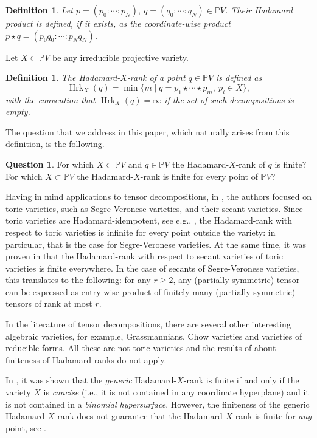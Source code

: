\documentclass{amsart}
\theoremstyle{plain}
\numberwithin{theorem}{section}
\newtheorem{definition}[theorem]{Definition}
\theoremstyle{definition}
\newtheorem*{question}{Question}
\newcommand{\bbP}{\mathbb{P}}
\newcommand{\Hrk}{\operatorname{Hrk}}
\begin{document}
\begin{definition}\label{def:hadamard_product}
    Let $p = (p_0:\cdots:p_N), \ q=(q_0:\cdots:q_N)\in\bbP V$. Their \emph{Hadamard product} is defined, if it exists, as the coordinate-wise product $p\star q = (p_0q_0:\cdots:p_Nq_N)$.
\end{definition}
Let $X \subset \bbP V$ be any irreducible projective variety.
\begin{definition}\label{def:Hadamard_rank}
    The \emph{Hadamard-$X$-rank} of a point $q \in \bbP V$ is defined as 
    \[
        \Hrk_X(q) = \min\{m \mid q = p_1 \star \cdots \star p_m, \ p_i \in X\},
    \]
    with the convention that $\Hrk_X(q) = \infty$ if the set of such decompositions is empty.
\end{definition}
The question that we address in this paper, which naturally arises from this definition, is the following.

\begin{question}\label{question}
    For which $X \subset \bbP V$ and $q \in \bbP V$ the Hadamard-$X$-rank of $q$ is finite? For which $X\subset \bbP V$ the Hadamard-$X$-rank is finite for every point of $\bbP V$?    
\end{question}

Having in mind applications to tensor decompositions, in \cite{hadamardranks}, the authors focused on toric varieties, such as Segre-Veronese varieties, and their secant varieties. Since toric varieties are Hadamard-idempotent, see e.g., \cite[Proposition 4.7]{FOW:MinkowskiHadamard}, the Hadamard-rank with respect to toric varieties is infinite for every point outside the variety: in particular, that is the case for Segre-Veronese varieties. At the same time, it was proven in \cite[Corollary 3.8]{hadamardranks} that the Hadamard-rank with respect to secant varieties of toric varieties is finite everywhere. In the case of secants of Segre-Veronese varieties, this translates to the following: for any $r \geq 2$, any (partially-symmetric) tensor can be expressed as entry-wise product of finitely many (partially-symmetric) tensors of rank at most $r$. 

In the literature of tensor decompositions, there are several other interesting algebraic varieties, for example, Grassmannians, Chow varieties and varieties of reducible forms. All these are not toric varieties and the results of \cite{hadamardranks} about finiteness of Hadamard ranks do not apply.

In \cite[Corollary 3.40]{hadamardranks}, it was shown that the \textit{generic} Hadamard-$X$-rank is finite if and only if the variety $X$ is \textit{concise} (i.e., it is not contained in any coordinate hyperplane) and it is not contained in a \textit{binomial hypersurface}. However, the finiteness of the  generic Hadamard-$X$-rank does not guarantee that the Hadamard-$X$-rank is finite for \textit{any} point, see \cite[Example 3.10]{hadamardranks}. 
\end{document}
